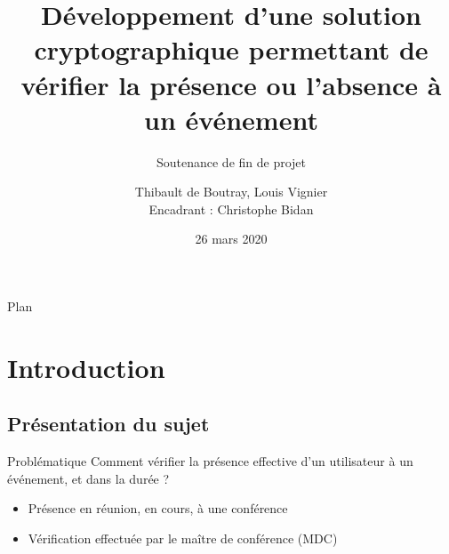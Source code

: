 \documentclass[aspectratio=169]{beamer}
\title{Développement d'une solution cryptographique permettant de vérifier la présence ou l'absence à un événement}
\subtitle{Soutenance de fin de projet}
\author[me]{Thibault de Boutray, Louis Vignier\\[2mm]Encadrant : Christophe Bidan}
\institute{CentraleSupélec}
\date{26 mars 2020}
\begin{document}
\begin{frame}
  \titlepage
\end{frame}

\begin{frame}{Plan}
  \tableofcontents[
    sectionstyle=show/show,
    subsectionstyle=hide/hide/hide
]
\end{frame}

\section{Introduction}

\subsection{Présentation du sujet}

\begin{frame}{Problématique}
  Comment vérifier la présence effective d'un utilisateur à un événement, et dans la durée ?

  \bigskip

  \begin{itemize}
    \item Présence en réunion, en cours, à une conférence
    \item Vérification effectuée par le maître de conférence (MDC)
  \end{itemize}

\end{frame}
\end{document}
